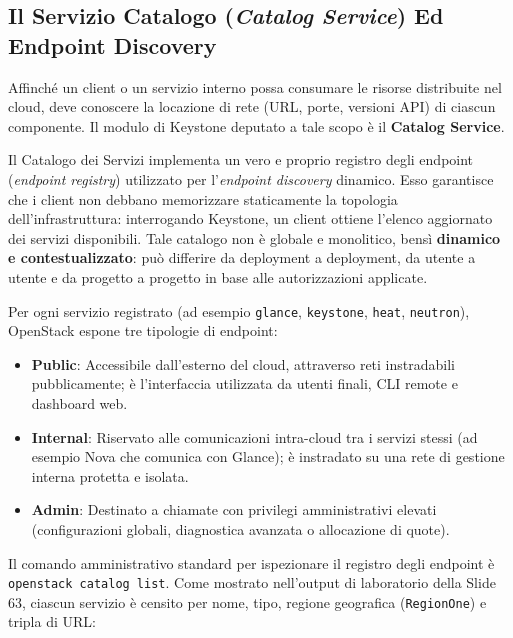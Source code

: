 \documentclass[11pt, a4paper]{article}
\begin{document}
\subsection{Il Servizio Catalogo (\emph{Catalog Service}) Ed Endpoint Discovery}

Affinché un client o un servizio interno possa consumare le risorse distribuite nel cloud, deve conoscere la locazione di rete (URL, porte, versioni API) di ciascun componente. Il modulo di Keystone deputato a tale scopo è il \textbf{Catalog Service}.

Il Catalogo dei Servizi implementa un vero e proprio registro degli endpoint (\emph{endpoint registry}) utilizzato per l'\emph{endpoint discovery} dinamico. Esso garantisce che i client non debbano memorizzare staticamente la topologia dell'infrastruttura: interrogando Keystone, un client ottiene l'elenco aggiornato dei servizi disponibili. Tale catalogo non è globale e monolitico, bensì \textbf{dinamico e contestualizzato}: può differire da deployment a deployment, da utente a utente e da progetto a progetto in base alle autorizzazioni applicate.

Per ogni servizio registrato (ad esempio \texttt{glance}, \texttt{keystone}, \texttt{heat}, \texttt{neutron}), OpenStack espone tre tipologie di endpoint:
\begin{itemize}[noitemsep]
    \item \textbf{Public}: Accessibile dall'esterno del cloud, attraverso reti instradabili pubblicamente; è l'interfaccia utilizzata da utenti finali, CLI remote e dashboard web.
    \item \textbf{Internal}: Riservato alle comunicazioni intra-cloud tra i servizi stessi (ad esempio Nova che comunica con Glance); è instradato su una rete di gestione interna protetta e isolata.
    \item \textbf{Admin}: Destinato a chiamate con privilegi amministrativi elevati (configurazioni globali, diagnostica avanzata o allocazione di quote).
\end{itemize}


Il comando amministrativo standard per ispezionare il registro degli endpoint è \texttt{openstack catalog list}. Come mostrato nell'output di laboratorio della Slide 63, ciascun servizio è censito per nome, tipo, regione geografica (\texttt{RegionOne}) e tripla di URL:
\end{document}
